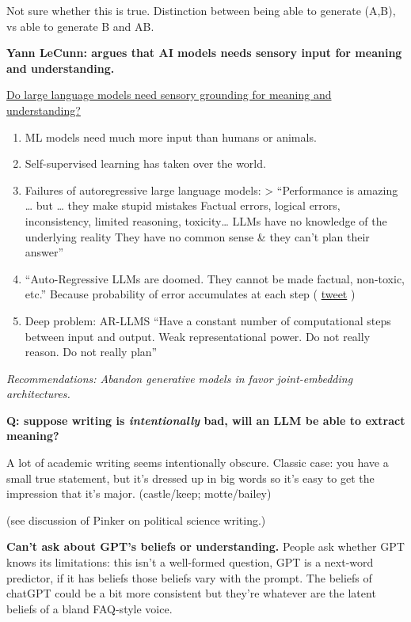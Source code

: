 \documentclass[
  11pt,
  letterpaper,
  DIV=11,
  numbers=noendperiod,
  oneside]{scrartcl}
\begin{document}
Not sure whether this is true. Distinction between being able to
generate (A,B), vs able to generate B and A\textbar B.

\textbf{Yann LeCunn: argues that AI models needs sensory input for
meaning and understanding.}

\href{https://drive.google.com/file/d/1BU5bV3X5w65DwSMapKcsr0ZvrMRU_Nbi/view}{Do
large language models need sensory grounding for meaning and
understanding?}

\begin{enumerate}
\def\labelenumi{\arabic{enumi}.}
\item
  ML models need much more input than humans or animals.
\item
  Self-supervised learning has taken over the world.
\item
  Failures of autoregressive large language models: \textgreater{}
  ``Performance is amazing \ldots{} but \ldots{} they make stupid
  mistakes Factual errors, logical errors, inconsistency, limited
  reasoning, toxicity\ldots{} LLMs have no knowledge of the underlying
  reality They have no common sense \& they can't plan their answer''
\item
  ``Auto-Regressive LLMs are doomed. They cannot be made factual,
  non-toxic, etc.'' Because probability of error accumulates at each
  step (
  \href{https://twitter.com/ylecun/status/1640122342570336267?s=20}{tweet}
  )
\item
  Deep problem: AR-LLMS ``Have a constant number of computational steps
  between input and output. Weak representational power. Do not really
  reason. Do not really plan''
\end{enumerate}

\emph{Recommendations: Abandon generative models in favor
joint-embedding architectures.}

\textbf{Q: suppose writing is \emph{intentionally} bad, will an LLM be
able to extract meaning?}

A lot of academic writing seems intentionally obscure. Classic case: you
have a small true statement, but it's dressed up in big words so it's
easy to get the impression that it's major. (castle/keep; motte/bailey)

(see discussion of Pinker on political science writing.)

\textbf{Can't ask about GPT's beliefs or understanding.} People ask
whether GPT knows its limitations: this isn't a well-formed question,
GPT is a next-word predictor, if it has beliefs those beliefs vary with
the prompt. The beliefs of chatGPT could be a bit more consistent but
they're whatever are the latent beliefs of a bland FAQ-style voice.
\end{document}
